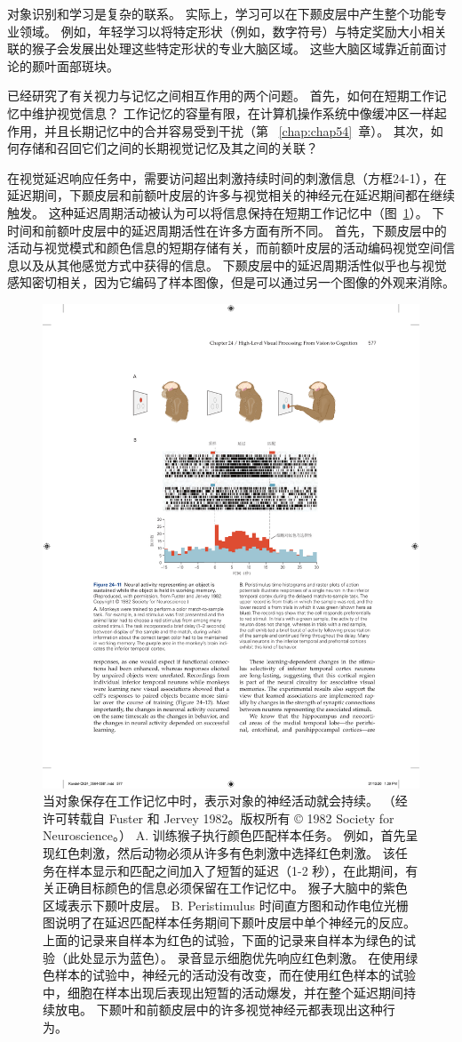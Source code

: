对象识别和学习是复杂的联系。
实际上，学习可以在下颞皮层中产生整个功能专业领域。 
例如，年轻学习以将特定形状（例如，数字符号）与特定奖励大小相关联的猴子会发展出处理这些特定形状的专业大脑区域。
这些大脑区域靠近前面讨论的颞叶面部斑块。


已经研究了有关视力与记忆之间相互作用的两个问题。
首先，如何在短期工作记忆中维护视觉信息？
工作记忆的容量有限，在计算机操作系统中像缓冲区一样起作用，并且长期记忆中的合并容易受到干扰（第 ~\ref{chap:chap54}~章）。
其次，如何存储和召回它们之间的长期视觉记忆及其之间的关联？


在视觉延迟响应任务中，需要访问超出刺激持续时间的刺激信息（方框24-1），在延迟期间，下颞皮层和前额叶皮层的许多与视觉相关的神经元在延迟期间都在继续触发。
这种延迟周期活动被认为可以将信息保持在短期工作记忆中（图~\ref{fig:24_11}）。
下时间和前额叶皮层中的延迟周期活性在许多方面有所不同。
首先，下颞皮层中的活动与视觉模式和颜色信息的短期存储有关，而前额叶皮层的活动编码视觉空间信息以及从其他感觉方式中获得的信息。
下颞皮层中的延迟周期活性似乎也与视觉感知密切相关，因为它编码了样本图像，但是可以通过另一个图像的外观来消除。


\begin{figure}[htbp]
	\centering
	\includegraphics[width=0.75\linewidth]{chap24/fig_24_11}
	\caption{当对象保存在工作记忆中时，表示对象的神经活动就会持续。 （经许可转载自 Fuster 和 Jervey 1982。版权所有 © 1982 Society for Neuroscience。） A. 训练猴子执行颜色匹配样本任务。 例如，首先呈现红色刺激，然后动物必须从许多有色刺激中选择红色刺激。 该任务在样本显示和匹配之间加入了短暂的延迟（1-2 秒），在此期间，有关正确目标颜色的信息必须保留在工作记忆中。 猴子大脑中的紫色区域表示下颞叶皮层。 B. Peristimulus 时间直方图和动作电位光栅图说明了在延迟匹配样本任务期间下颞叶皮层中单个神经元的反应。 上面的记录来自样本为红色的试验，下面的记录来自样本为绿色的试验（此处显示为蓝色）。 录音显示细胞优先响应红色刺激。 在使用绿色样本的试验中，神经元的活动没有改变，而在使用红色样本的试验中，细胞在样本出现后表现出短暂的活动爆发，并在整个延迟期间持续放电。 下颞叶和前额皮层中的许多视觉神经元都表现出这种行为。}
	\label{fig:24_11}
\end{figure}


